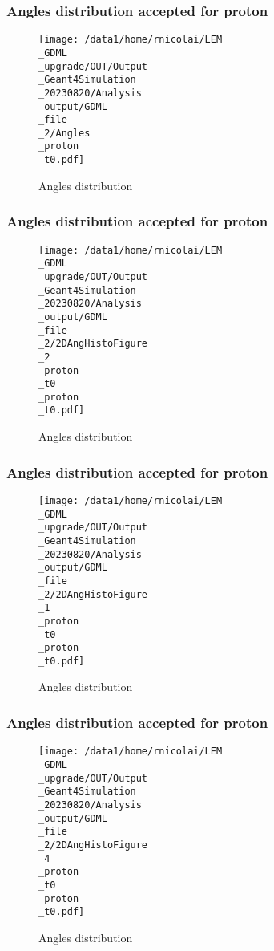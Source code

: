 \documentclass[8pt]{beamer}
\begin{document}
            \begin{frame}
                \frametitle{Angles distribution accepted for proton}
            
        \begin{figure}[h]
            \centering
            \texttt{[image: /data1/home/rnicolai/LEM\\\_GDML\\\_upgrade/OUT/Output\\\_Geant4Simulation\\\_20230820/Analysis\\\_output/GDML\\\_file\\\_2/Angles\\\_proton\\\_t0.pdf]}
            \caption{Angles distribution}
        \end{figure}
        
            \end{frame}
            
            \begin{frame}
                \frametitle{Angles distribution accepted for proton}
            
        \begin{figure}[h]
            \centering
            \texttt{[image: /data1/home/rnicolai/LEM\\\_GDML\\\_upgrade/OUT/Output\\\_Geant4Simulation\\\_20230820/Analysis\\\_output/GDML\\\_file\\\_2/2DAngHistoFigure\\\_2\\\_proton\\\_t0\\\_proton\\\_t0.pdf]}
            \caption{Angles distribution}
        \end{figure}
        
            \end{frame}
            
            \begin{frame}
                \frametitle{Angles distribution accepted for proton}
            
        \begin{figure}[h]
            \centering
            \texttt{[image: /data1/home/rnicolai/LEM\\\_GDML\\\_upgrade/OUT/Output\\\_Geant4Simulation\\\_20230820/Analysis\\\_output/GDML\\\_file\\\_2/2DAngHistoFigure\\\_1\\\_proton\\\_t0\\\_proton\\\_t0.pdf]}
            \caption{Angles distribution}
        \end{figure}
        
            \end{frame}
            
            \begin{frame}
                \frametitle{Angles distribution accepted for proton}
            
        \begin{figure}[h]
            \centering
            \texttt{[image: /data1/home/rnicolai/LEM\\\_GDML\\\_upgrade/OUT/Output\\\_Geant4Simulation\\\_20230820/Analysis\\\_output/GDML\\\_file\\\_2/2DAngHistoFigure\\\_4\\\_proton\\\_t0\\\_proton\\\_t0.pdf]}
            \caption{Angles distribution}
        \end{figure}
        
            \end{frame}
            
\end{document}
